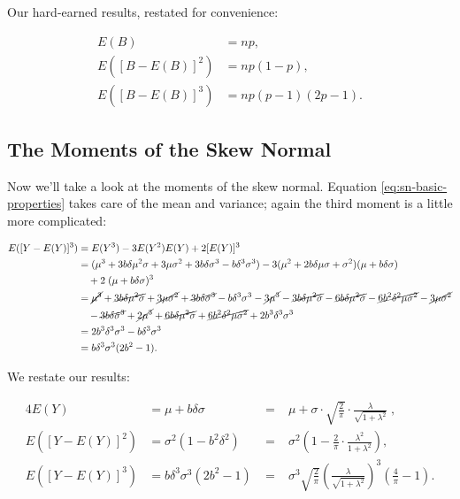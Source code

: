 \documentclass{article}
\begin{document}
Our hard-earned results, restated for convenience:

\begin{align}
  E(B) &= np, \nonumber \\
  E([B - E(B)]^2) &= np(1-p), \\
  E([B - E(B)]^3) &= np(p-1)(2p-1). \nonumber
\end{align}

\subsection{The Moments of the Skew Normal}

Now we'll take a look at the moments of the skew normal. Equation
\eqref{eq:sn-basic-properties} takes care of the mean and variance; again the
third moment is a little more complicated:

\begin{align*}
  E([Y - E(Y)]^3) &= E(Y^3) - 3E(Y^2)E(Y) + 2[E(Y)]^3 \\
  &= (\mu^3 + 3 b \delta \mu^2 \sigma + 3 \mu \sigma^2 + 3 b \delta \sigma^3 - b \delta^3 \sigma^3) - 3 (\mu^2 + 2b \delta \mu \sigma + \sigma^2) (\mu + b \delta \sigma) \\
  & \quad + 2\;(\mu + b \delta \sigma)^3 \\
  &= \cancel{\mu^3} + \cancel{3 b \delta \mu^2 \sigma} + \cancel{3 \mu \sigma^2} + \cancel{3 b \delta \sigma^3} - b \delta^3 \sigma^3 - \cancel{3 \mu^3} - \cancel{3 b \delta \mu^2 \sigma} -
    \cancel{6 b \delta \mu^2 \sigma} - \cancel{6 b^2 \delta^2 \mu \sigma^2} - \cancel{3 \mu \sigma^2} \\
  & \quad - \cancel{3 b \delta \sigma^3} + \cancel{2 \mu^3} + \cancel{6 b \delta \mu^2 \sigma} + \cancel{6 b^2 \delta^2 \mu \sigma^2} + 2 b^3 \delta^3 \sigma^3 \\
  &= 2 b^3 \delta^3 \sigma^3 - b \delta^3 \sigma^3 \\
  &= b \delta^3 \sigma^3 (2b^2 - 1).
\end{align*}

We restate our results:

\begin{alignat}{4}
  E(Y) &= \mu + b \delta \sigma \;&=&\; \mu + \sigma \cdot \sqrt{\frac{2}{\pi}} \cdot \frac{\lambda}{\sqrt{1 + \lambda^2}} \;, \nonumber \\
  E([Y - E(Y)]^2) &= \sigma^2 (1 - b^2 \delta^2) \;&=&\; \sigma^2 \left( 1 - \frac{2}{\pi} \cdot \frac{\lambda^2}{1 + \lambda^2} \right), \\
  E([Y - E(Y)]^3) &= b \delta^3 \sigma^3 (2b^2 - 1) \;&=&\; \sigma^3 \sqrt{\frac{2}{\pi}} \left( \frac{\lambda}{\sqrt{1 + \lambda^2}} \right)^3 \left( \frac{4}{\pi} - 1 \right). \nonumber
\end{alignat}
\end{document}
